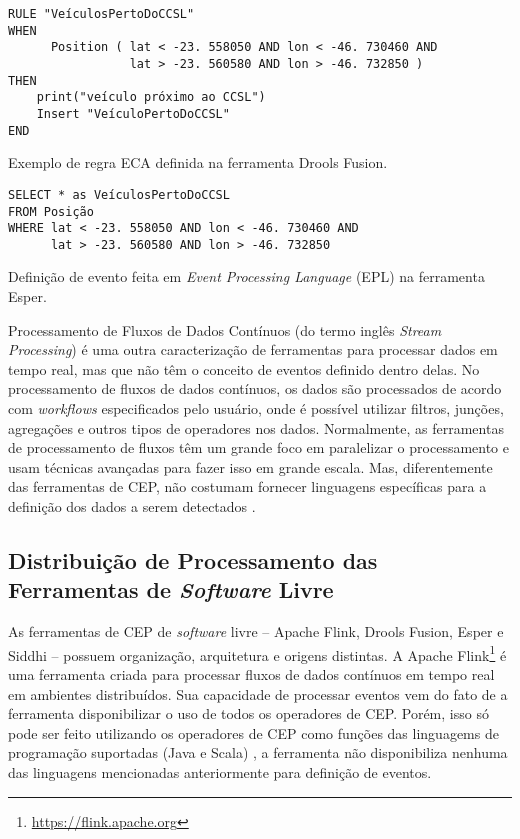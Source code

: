 \begin{evento}[t]
\begin{verbatim}
RULE "VeículosPertoDoCCSL"
WHEN 
      Position ( lat < -23. 558050 AND lon < -46. 730460 AND
                 lat > -23. 560580 AND lon > -46. 732850 )
THEN
    print("veículo próximo ao CCSL")
    Insert "VeículoPertoDoCCSL"
END                
\end{verbatim}
\caption{Exemplo de regra ECA definida na ferramenta Drools Fusion. }
\label{ECAruleexample}
\end{evento}

\begin{evento}[h]
\begin{verbatim}
SELECT * as VeículosPertoDoCCSL
FROM Posição
WHERE lat < -23. 558050 AND lon < -46. 730460 AND
      lat > -23. 560580 AND lon > -46. 732850
\end{verbatim}
\caption{Definição de evento feita em \textit{Event Processing Language} (EPL) na ferramenta Esper.}
\label{EPLexample}
\end{evento}

Processamento de Fluxos de Dados Contínuos (do termo inglês \textit{Stream Processing}) é uma outra caracterização de ferramentas para processar dados em tempo real, mas que não têm o conceito de eventos definido dentro delas. No processamento de fluxos de dados contínuos, os dados são processados de acordo com \textit{workflows} especificados pelo usuário, onde é possível utilizar filtros, junções, agregações e outros tipos de operadores nos dados. Normalmente, as ferramentas de processamento de fluxos têm um grande foco em  paralelizar o processamento e usam técnicas avançadas para fazer isso em grande escala. Mas, diferentemente das ferramentas de CEP, não costumam fornecer linguagens específicas para a definição dos dados a serem detectados \citep{Margara:2011:PFI:2002259.2002307}.

\subsection{Distribuição de Processamento das Ferramentas de \textit{Software} Livre}
\label{sub-sec:opensourcetoolsdistribution}

As ferramentas de CEP de \textit{software} livre -- Apache Flink, Drools Fusion, Esper e Siddhi -- possuem organização, arquitetura e origens distintas. A Apache Flink\footnote{\url{https://flink.apache.org}} é uma ferramenta criada para processar fluxos de dados contínuos em tempo real em ambientes distribuídos. Sua capacidade de processar eventos vem do fato de a ferramenta disponibilizar o uso de todos os operadores de CEP. Porém, isso só pode ser feito utilizando os operadores de CEP como funções das linguagems de programação suportadas (Java e Scala)%
, a ferramenta não disponibiliza nenhuma das linguagens mencionadas anteriormente para definição de eventos.

